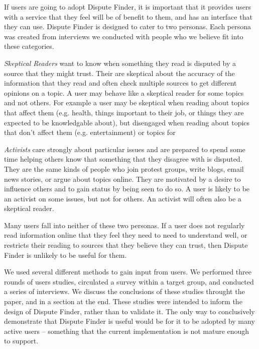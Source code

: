 \documentclass{www2010-submission}
\newcommand{\todo}[1]{}
\begin{document}
If users are going to adopt Dispute Finder, it is important that it provides users with a service that they feel will be of benefit to them, and has an interface that they can use. Dispute Finder is designed to cater to two personas. Each persona was created from interviews we conducted with people who we believe fit into these categories.

{\it Skeptical Readers} want to know when something they read is disputed by a source that they might trust. Their are skeptical about the accuracy of the information that they read and often check multiple sources to get different opinions on a topic. A user may behave like a skeptical reader for some topics and not others. For example a user may be skeptical when reading about topics that affect them (e.g. health, things important to their job, or things they are expected to be knowledgable about), but disengaged when reading about topics that don't affect them (e.g. entertainment) or topics for 
\todo{Use interviews to get some actual observations here. These are just fillers.}

{\it Activists} care strongly about particular issues and are prepared to spend some time helping others know that something that they disagree with is disputed. They are the same kinds of people who join protest groups, write blogs, email news stories, or argue about topics online. They are motivated by a desire to influence others and to gain status by being seen to do so. A user is likely to be an activist on some issues, but not for others. An activist will often also be a skeptical reader.

Many users fall into neither of these two personas. If a user does not regularly read information online that they feel they need to need to understand well, or restricts their reading to sources that they believe they can trust, then Dispute Finder is unlikely to be useful for them.

We used several different methods to gain input from users. We performed three rounds of users studies, circulated a survey within a target group, and conducted a series of interviews. We discuss the conclusions of these studies throught the paper, and in a section at the end. These studies were intended to inform the design of Dispute Finder, rather than to validate it. The only way to conclusively demonstrate that Dispute Finder is useful would be for it to be adopted by many active users -- something that the current implementation is not mature enough to support.

\todo{Improve the paraphraser UI so it shows users what pages are making the claim}
\todo{Improve the ``see examples on the web'' UI to it shows the pages that were found with the activists training work}
\todo{Provide a customized RSS reader and search engine that does dispute tracking. - future work?}
\end{document}

